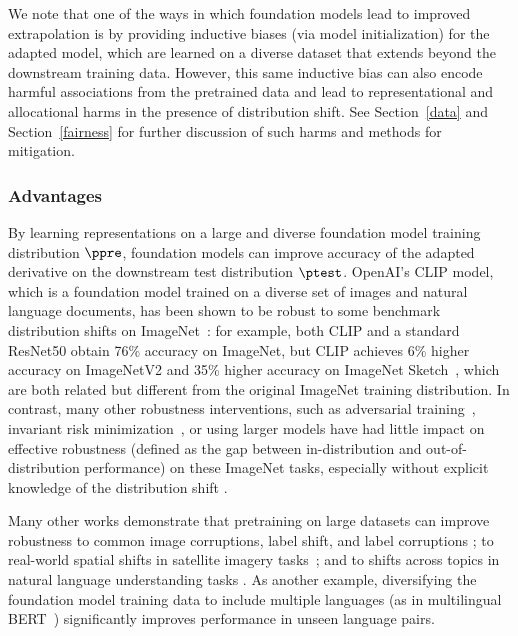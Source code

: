 We note that one of the ways in which foundation models lead to improved extrapolation is by providing inductive biases (via model initialization) for the adapted model, which are learned on a diverse dataset that extends beyond the downstream training data. However, this same inductive bias can also encode harmful associations from the pretrained data and lead to representational and allocational harms in the presence of distribution shift. See Section~\ref{data} and Section~\ref{fairness} for further discussion of such harms and methods for mitigation.

\subsubsection{Advantages}
\label{sec:robustness-advantages}

By learning representations on a large and diverse foundation model training distribution $\ppre$, foundation models can improve accuracy of the adapted derivative on the downstream test distribution $\ptest$.
OpenAI's CLIP model, which is a foundation model trained on a diverse set of images and natural language documents, has been shown to be robust to some benchmark distribution shifts on ImageNet~\citep{radford2021learning}: for example, both CLIP and a standard ResNet50 obtain 76\% accuracy on ImageNet, but CLIP achieves 6\% higher accuracy on ImageNetV2 \citep{recht2019doimagenet} and 35\% higher accuracy on ImageNet Sketch~\citep{radford2021learning}, which are both related but different from the original ImageNet training distribution. In contrast, many other robustness interventions, such as adversarial training~\citep{madry2018towards}, invariant risk minimization~\citep{arjovsky2019invariant}, or using larger models have had little impact on effective robustness (defined as the gap between in-distribution and out-of-distribution performance) on these ImageNet tasks, especially without explicit knowledge of the distribution shift \citep{taori2020measuring,santurkar2020breeds,radford2021learning,miller2021line}.

Many other works demonstrate that pretraining on large datasets can improve robustness to common image corruptions, label shift, and label corruptions \citep{hendrycks2019pretraining,hendrycks2019selfsupervised};  to real-world spatial shifts in satellite imagery tasks~\citep{xie2021innout,kumar2022finetuning}; and to shifts across topics in natural language understanding tasks \citep{hendrycks2020pretrained,fisch2019mrqa,yogatama2019learning}. As another example, diversifying the foundation model training data to include multiple languages (as in multilingual BERT~\citep{liu2020multilingual}) significantly improves performance in unseen language pairs.

